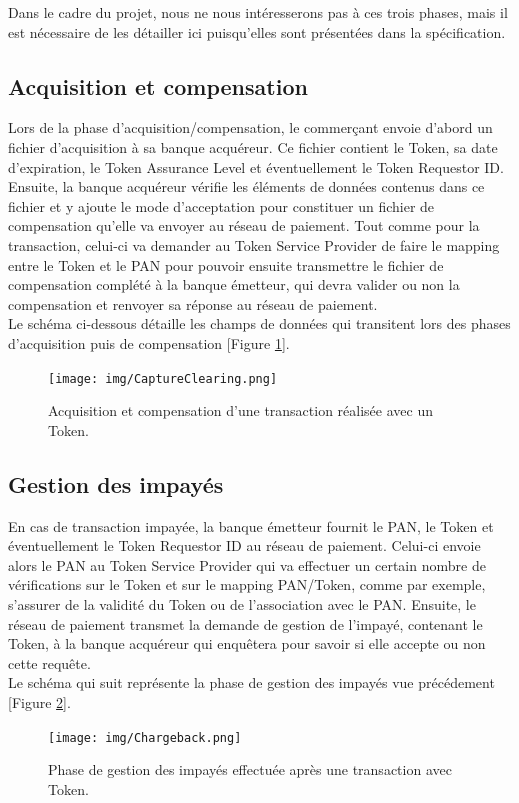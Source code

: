 \documentclass{report}
\begin{document}
\noindent
Dans le cadre du projet, nous ne nous intéresserons pas à ces trois phases, mais il est nécessaire de les détailler ici puisqu'elles sont présentées dans la spécification.

\subsection{Acquisition et compensation}
Lors de la phase d'acquisition/compensation, le commerçant envoie d'abord un fichier d'acquisition à sa banque acquéreur. Ce fichier contient le Token, sa date d'expiration, le Token Assurance Level et éventuellement le Token Requestor ID. Ensuite, la banque acquéreur vérifie les éléments de données contenus dans ce fichier et y ajoute le mode d'acceptation pour constituer un fichier de compensation qu'elle va envoyer au réseau de paiement. Tout comme pour la transaction, celui-ci va demander au Token Service Provider de faire le mapping entre le Token et le PAN pour pouvoir ensuite transmettre le fichier de compensation complété à la banque émetteur, qui devra valider ou non la compensation et renvoyer sa réponse au réseau de paiement.\\

\newpage
\noindent
Le schéma ci-dessous détaille les champs de données qui transitent lors des phases d'acquisition puis de compensation [Figure \ref{CaptureClearing}].

\begin{figure}[!ht]
    \centering
			\texttt{[image: img/CaptureClearing.png]}
			\caption{\label{CaptureClearing} Acquisition et compensation d'une transaction réalisée avec un Token.}			
\end{figure}

\subsection{Gestion des impayés}
En cas de transaction impayée, la banque émetteur fournit le PAN, le Token et éventuellement le Token Requestor ID au réseau de paiement. Celui-ci envoie alors le PAN au Token Service Provider qui va effectuer un certain nombre de vérifications sur le Token et sur le mapping PAN/Token, comme par exemple, s'assurer de la validité du Token ou de l'association avec le PAN. Ensuite, le réseau de paiement transmet la demande de gestion de l'impayé, contenant le Token, à la banque acquéreur qui enquêtera pour savoir si elle accepte ou non cette requête.\\

\noindent
Le schéma qui suit représente la phase de gestion des impayés vue précédement [Figure \ref{Impayes}].

\begin{figure}[!ht]
    \centering
			\texttt{[image: img/Chargeback.png]}
			\caption{\label{Impayes} Phase de gestion des impayés effectuée après une transaction avec Token.}			
\end{figure}
\end{document}
